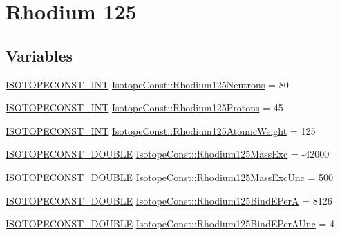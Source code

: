 \hypertarget{group___isotope_const-_rhodium-_rh125}{}\section{Rhodium 125}
\label{group___isotope_const-_rhodium-_rh125}
\subsection*{Variables}
\begin{DoxyCompactItemize}
\item 
\mbox{\hyperlink{group___isotope_const-_macros_ga5f18360b3e99483a35c32d789e62621c}{I\+S\+O\+T\+O\+P\+E\+C\+O\+N\+S\+T\+\_\+\+I\+NT}} \mbox{\hyperlink{group___isotope_const-_rhodium-_rh125_gad86bcf198ebff45956da9f6152f37538}{Isotope\+Const\+::\+Rhodium125\+Neutrons}} = 80
\item 
\mbox{\hyperlink{group___isotope_const-_macros_ga5f18360b3e99483a35c32d789e62621c}{I\+S\+O\+T\+O\+P\+E\+C\+O\+N\+S\+T\+\_\+\+I\+NT}} \mbox{\hyperlink{group___isotope_const-_rhodium-_rh125_gae4122c818dcf99f92e24b50d677ce1fc}{Isotope\+Const\+::\+Rhodium125\+Protons}} = 45
\item 
\mbox{\hyperlink{group___isotope_const-_macros_ga5f18360b3e99483a35c32d789e62621c}{I\+S\+O\+T\+O\+P\+E\+C\+O\+N\+S\+T\+\_\+\+I\+NT}} \mbox{\hyperlink{group___isotope_const-_rhodium-_rh125_ga1e86bbfc538af6fb6dc6b40d3a3bd93b}{Isotope\+Const\+::\+Rhodium125\+Atomic\+Weight}} = 125
\item 
\mbox{\hyperlink{group___isotope_const-_macros_ga8f45a7272ce02c0b4c65c44636ed719a}{I\+S\+O\+T\+O\+P\+E\+C\+O\+N\+S\+T\+\_\+\+D\+O\+U\+B\+LE}} \mbox{\hyperlink{group___isotope_const-_rhodium-_rh125_ga99409f1461a13af96df07ce5f6a98a17}{Isotope\+Const\+::\+Rhodium125\+Mass\+Exc}} = -\/42000
\item 
\mbox{\hyperlink{group___isotope_const-_macros_ga8f45a7272ce02c0b4c65c44636ed719a}{I\+S\+O\+T\+O\+P\+E\+C\+O\+N\+S\+T\+\_\+\+D\+O\+U\+B\+LE}} \mbox{\hyperlink{group___isotope_const-_rhodium-_rh125_gad1f8c3bfea7756731765c8c5fb73f6e7}{Isotope\+Const\+::\+Rhodium125\+Mass\+Exc\+Unc}} = 500
\item 
\mbox{\hyperlink{group___isotope_const-_macros_ga8f45a7272ce02c0b4c65c44636ed719a}{I\+S\+O\+T\+O\+P\+E\+C\+O\+N\+S\+T\+\_\+\+D\+O\+U\+B\+LE}} \mbox{\hyperlink{group___isotope_const-_rhodium-_rh125_ga80188aa5f7aea6367038517f8219ece1}{Isotope\+Const\+::\+Rhodium125\+Bind\+E\+PerA}} = 8126
\item 
\mbox{\hyperlink{group___isotope_const-_macros_ga8f45a7272ce02c0b4c65c44636ed719a}{I\+S\+O\+T\+O\+P\+E\+C\+O\+N\+S\+T\+\_\+\+D\+O\+U\+B\+LE}} \mbox{\hyperlink{group___isotope_const-_rhodium-_rh125_gaeb57fb59d9566f4cee49a97dc64d1272}{Isotope\+Const\+::\+Rhodium125\+Bind\+E\+Per\+A\+Unc}} = 4

\end{DoxyCompactItemize}
